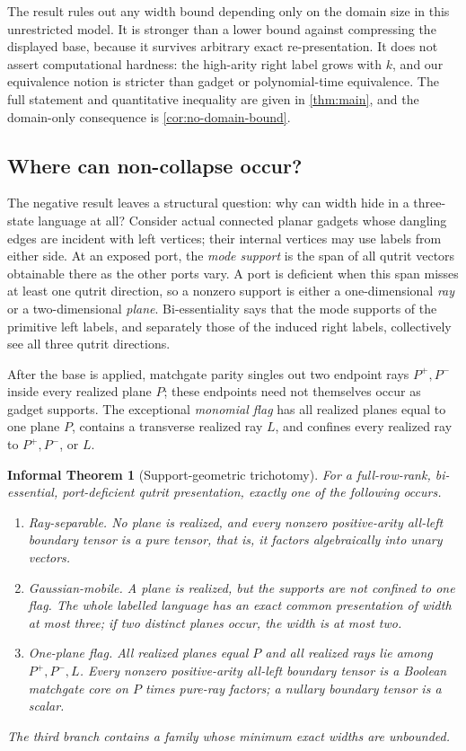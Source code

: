 \documentclass[11pt]{article}
\newtheorem*{informaltheorem}{Informal Theorem}
\theoremstyle{definition}
\theoremstyle{remark}
\begin{document}
The result rules out any width bound depending only on the domain size in
this unrestricted model.  It is stronger than a lower bound against
compressing the displayed base, because it survives arbitrary exact
re-presentation.  It does not assert computational hardness: the high-arity
right label grows with $k$, and our equivalence notion is stricter than gadget
or polynomial-time equivalence.  The full statement and quantitative
inequality are given in \cref{thm:main}, and the domain-only consequence is
\cref{cor:no-domain-bound}.

\subsection{Where can non-collapse occur?}

The negative result leaves a structural question: why can width hide in a
three-state language at all?  Consider actual connected planar gadgets whose
dangling edges are incident with left vertices; their internal vertices may
use labels from either side.  At an exposed port, the \emph{mode support} is
the span of all qutrit vectors obtainable there as the other ports vary.  A
port is deficient when this span misses at least one qutrit direction, so a
nonzero support is either a one-dimensional \emph{ray} or a two-dimensional
\emph{plane}.  Bi-essentiality says that the mode supports of the primitive
left labels, and separately those of the induced right labels, collectively
see all three qutrit directions.

After the base is applied, matchgate parity singles out two endpoint rays
$P^+,P^-$ inside every realized plane $P$; these endpoints need not
themselves occur as gadget supports.  The exceptional \emph{monomial flag}
has all realized planes equal to one plane $P$, contains a transverse realized
ray $L$, and confines every realized ray to $P^+,P^-$, or $L$.

\begin{informaltheorem}[Support-geometric trichotomy]
For a full-row-rank, bi-essential, port-deficient qutrit presentation,
exactly one of the following occurs.
\begin{enumerate}[label=\textup{(\Roman*)}]
  \item \emph{Ray-separable.}  No plane is realized, and every nonzero
  positive-arity all-left boundary tensor is a pure tensor, that is, it
  factors algebraically into unary vectors.
  \item \emph{Gaussian-mobile.}  A plane is realized, but the supports are
  not confined to one flag.  The whole labelled language has an exact common
  presentation of width at most three; if two distinct planes occur, the
  width is at most two.
  \item \emph{One-plane flag.}  All realized planes equal $P$ and all
  realized rays lie among $P^+,P^-,L$.  Every nonzero positive-arity
  all-left boundary tensor is a Boolean matchgate core on $P$ times pure-ray
  factors; a nullary boundary tensor is a scalar.
\end{enumerate}
The third branch contains a family whose minimum exact widths are unbounded.
\end{informaltheorem}
\end{document}
